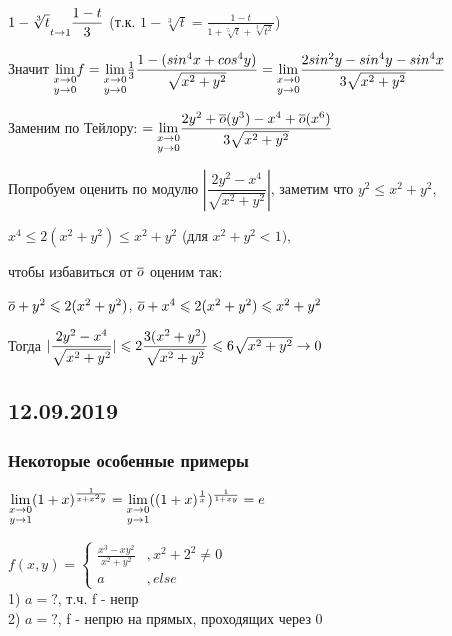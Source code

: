\documentclass[12pt, fleqn]{article}
\begin{document}
\begin{sol}
    $1-\sqrt[3]{t} \underset{t \rightarrow 1}{~} \dfrac{1-t}{3}$ (т.к. $1-\sqrt[3]{t}=\frac{1-t}{1+\sqrt[5]{t}+\sqrt[3]{t^2}}$)

    Значит $\underset{y \rightarrow 0}{\lim\limits_{x \rightarrow 0}} f = \underset{y \rightarrow 0}{\lim\limits_{x \rightarrow 0}} \frac{1}{3} \dfrac{1-(sin^4 x + cos^4 y)}{\sqrt{x^2+y^2}} = \underset{y \rightarrow 0}{\lim\limits_{x \rightarrow 0}} \dfrac{2sin^2 y - sin^4 y - sin^4 x}{3 \sqrt{x^2+y^2}}$

    Заменим по Тейлору: $=\underset{y \rightarrow 0}{\lim\limits_{x \rightarrow 0}} \dfrac{2y^2 + \overline{o}(y^3)-x^4 + \overline{o}(x^6)}{3 \sqrt{x^2+y^2}}$

    Попробуем оценить по модулю $|\dfrac{2y^2-x^4}{\sqrt{x^2+y^2}}|$, заметим что $y^2 \leqslant x^2 + y^2$,

    $x^4 \leqslant 2(x^2+y^2) \leqslant x^2+y^2$ (для $x^2+y^2 < 1)$,

    чтобы избавиться от $\overline{o}$ оценим так:

    $\overline{o} + y^2 \leqslant 2(x^2 + y^2)$, $\overline{o} + x^4 \leqslant 2(x^2+y^2) \leqslant x^2+y^2$

    Тогда $|\dfrac{2y^2-x^4}{\sqrt{x^2+y^2}}| \leqslant 2 \dfrac{3(x^2+y^2)}{\sqrt{x^2+y^2}} \leqslant 6 \sqrt{x^2+y^2} \rightarrow 0$
\end{sol}

\newpage
\subsection{12.09.2019}
\subsubsection{Некоторые особенные примеры}
\begin{example}
    $\underset{y \rightarrow 1}{\lim\limits_{x \rightarrow 0}} (1+x)^{\frac{1}{x+x^2 y}}=\underset{y \rightarrow 1}{\lim\limits_{x \rightarrow 0}} ((1+x)^{\frac{1}{x}})^{\frac{1}{1+x y}}=e$
\end{example}

\begin{example}
    $f(x,y)=\begin{cases} \frac{x^3-xy^2}{x^2+y^2} &,x^2+2^2 \neq 0\\ a & , else \end{cases}$\\
    1) $a=?$, т.ч. f - непр\\
    2) $a=?$, f - непрю на прямых, проходящих через 0\\
\end{example}
\end{document}
